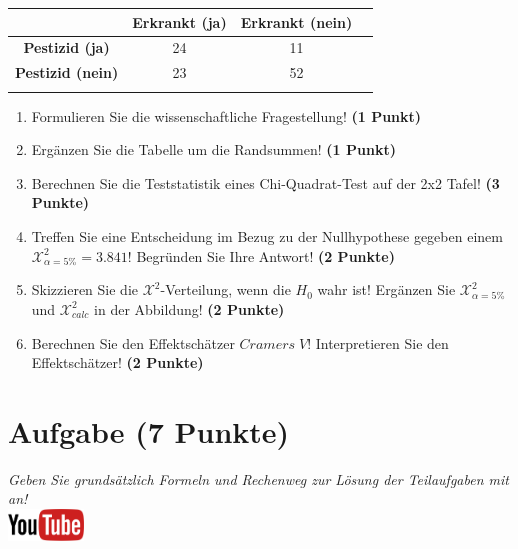 \documentclass[a4paper, 9pt]{scrartcl}\usepackage[]{graphicx}\usepackage[]{xcolor}
\begin{document}
\begin{center}
  \Large
  \begin{tabular}{c|c|c|c}
     & \textbf{Erkrankt (ja)} & \textbf{Erkrankt (nein)} &  \strut\\
    \hline
    \textbf{Pestizid (ja)} & 24  & 11  &     \strut\\
    \hline
    \textbf{Pestizid (nein)} & 23  & 52  &      \strut\\
    \hline
     \phantom{100} & \phantom{100}  & \phantom{100}  &  \phantom{100}  \strut\\
  \end{tabular}
\end{center}

\vspace{5Ex}

\begin{enumerate}
\item Formulieren Sie die wissenschaftliche Fragestellung! \textbf{(1 Punkt)}
\item Erg{\"a}nzen Sie die Tabelle um die Randsummen! \textbf{(1 Punkt)} 
\item Berechnen Sie die Teststatistik eines Chi-Quadrat-Test auf der 2x2
  Tafel! \textbf{(3 Punkte)}
\item Treffen Sie eine Entscheidung im Bezug zu der Nullhypothese gegeben
  einem $\mathcal{X}^2_{\alpha = 5\%} = 3.841$! Begr{\"u}nden Sie Ihre Antwort!
  \textbf{(2 Punkte)}
\item Skizzieren Sie die $\mathcal{X}^2$-Verteilung, wenn die $H_0$ wahr
  ist! Erg{\"a}nzen Sie  $\mathcal{X}^2_{\alpha = 5\%}$ und
  $\mathcal{X}^2_{calc}$ in der Abbildung! \textbf{(2 Punkte)}
\item Berechnen Sie den Effektsch{\"a}tzer $Cramers\; V$! Interpretieren Sie den
  Effektsch{\"a}tzer! \textbf{(2 Punkte)}
\end{enumerate} 
\clearpage

\section{Aufgabe \hfill (7 Punkte)}

\textit{Geben Sie grunds{\"a}tzlich Formeln und Rechenweg zur L{\"o}sung der
  Teilaufgaben mit an!} \\[1Ex]

\hfill\href{https://youtu.be/jakM7fHyZfU}{\includegraphics[width =
  2cm]{img/youtube}}\\[1Ex]
\end{document}
